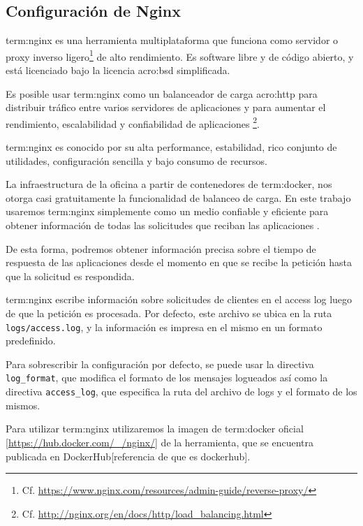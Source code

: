 \subsection{Configuración de Nginx}
\label{configuracion_de_nginx}

\gls{term:nginx} es una herramienta multiplataforma que funciona como servidor
 o proxy inverso ligero\footnote{Cf.
\url{https://www.nginx.com/resources/admin-guide/reverse-proxy/}} de alto
rendimiento. Es software libre y de código abierto, y está licenciado bajo la
licencia \gls{acro:bsd} simplificada.

Es posible usar \gls{term:nginx} como un balanceador de carga \gls{acro:http}
para distribuir tráfico entre varios servidores de aplicaciones y para aumentar
el rendimiento, escalabilidad y confiabilidad de aplicaciones
 \footnote{Cf.
\url{http://nginx.org/en/docs/http/load_balancing.html}}.

\gls{term:nginx} es conocido por su alta performance, estabilidad, rico
conjunto de utilidades, configuración sencilla y bajo consumo de recursos.

La infraestructura de la oficina a partir de contenedores de \gls{term:docker},
nos otorga casi gratuitamente la funcionalidad de balanceo de carga. En este
trabajo usaremos \gls{term:nginx} simplemente como un medio confiable y
eficiente para obtener información de todas las solicitudes que reciban las
aplicaciones .

De esta forma, podremos obtener información precisa sobre el tiempo de
respuesta de las aplicaciones desde el momento en que se recibe la petición
hasta que la solicitud es respondida.

\gls{term:nginx} escribe información sobre solicitudes de clientes en el access
log luego de que la petición  es procesada. Por defecto, este
archivo se ubica en la ruta \texttt{logs/access.log}, y la información es
impresa en el mismo en un formato predefinido.

Para sobrescribir la configuración por defecto, se puede usar la directiva
\texttt{log\_format}, que modifica el formato de los mensajes logueados así
como la directiva \texttt{access\_log}, que especifica la ruta del archivo de
logs y el formato de los mismos.

Para utilizar \gls{term:nginx} utilizaremos la imagen de \gls{term:docker}
oficial [\url{https://hub.docker.com/_/nginx/}] de la herramienta, que se
encuentra publicada en DockerHub[referencia de que es dockerhub].

